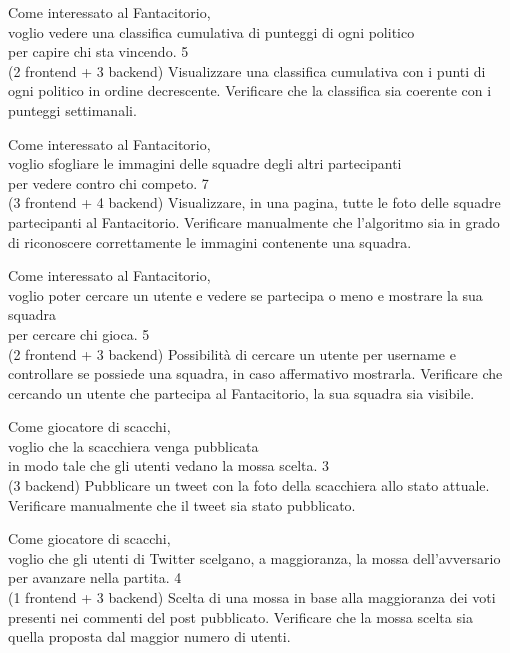 \userstory%
{Come interessato al Fantacitorio,\\voglio vedere una classifica cumulativa di punteggi di ogni politico\\per capire chi sta vincendo.}%
{5\\(2 frontend + 3 backend)}%
{Visualizzare una classifica cumulativa con i punti di ogni politico in ordine decrescente.}%
{Verificare che la classifica sia coerente con i punteggi settimanali.}

\userstory%
{Come interessato al Fantacitorio,\\voglio sfogliare le immagini delle squadre degli altri partecipanti\\per vedere contro chi competo.}%
{7\\(3 frontend + 4 backend)}%
{Visualizzare, in una pagina, tutte le foto delle squadre partecipanti al Fantacitorio.}%
{Verificare manualmente che l'algoritmo sia in grado di riconoscere correttamente le immagini contenente una squadra.}

\userstory%
{Come interessato al Fantacitorio,\\voglio poter cercare un utente e vedere se partecipa o meno e mostrare la sua squadra\\per cercare chi gioca.}%
{5\\(2 frontend + 3 backend)}%
{Possibilità di cercare un utente per username e controllare se possiede una squadra, in caso affermativo mostrarla.}%
{Verificare che cercando un utente che partecipa al Fantacitorio, la sua squadra sia visibile.}

\userstory%
{Come giocatore di scacchi,\\voglio che la scacchiera venga pubblicata\\in modo tale che gli utenti vedano la mossa scelta.}%
{3\\(3 backend)}%
{Pubblicare un tweet con la foto della scacchiera allo stato attuale.}%
{Verificare manualmente che il tweet sia stato pubblicato.}

\userstory%
{Come giocatore di scacchi,\\voglio che gli utenti di Twitter scelgano, a maggioranza, la mossa dell'avversario\\per avanzare nella partita.}%
{4\\(1 frontend + 3 backend)}%
{Scelta di una mossa in base alla maggioranza dei voti presenti nei commenti del post pubblicato.}%
{Verificare che la mossa scelta sia quella proposta dal maggior numero di utenti.}

